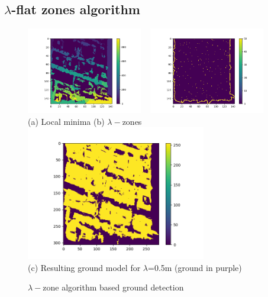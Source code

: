 \documentclass{kththesis}
\begin{document}
\subsection{$\lambda$-flat zones algorithm}
\begin{figure}[H]
 \centering
        \includegraphics[width=0.45\textwidth]{images/Results/biggest_lambda_zones.png} ~ \includegraphics[width=0.45\textwidth]{images/Results/local_minima.png}  \\
      (a) Local minima \qquad  \qquad \qquad(b) $\lambda-$zones \\
   
    \includegraphics[width=0.7\textwidth]{images/Results/1msquare_zones.png}\\
    (c) Resulting ground model for $\lambda$=0.5m (ground in purple)
    
    \caption{$\lambda-$zone algorithm based ground detection}
    \label{fig:minimaAndGroundModel}
\end{figure}
\end{document}
